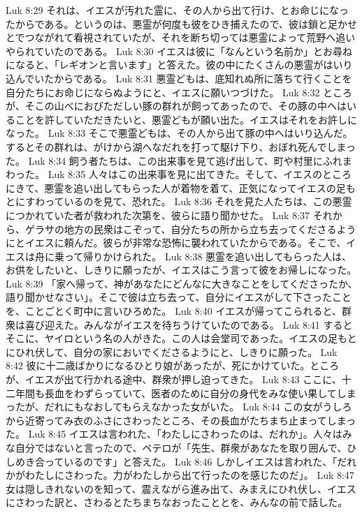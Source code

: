 Luk 8:29  それは、イエスが汚れた霊に、その人から出て行け、とお命じになったからである。というのは、悪霊が何度も彼をひき捕えたので、彼は鎖と足かせとでつながれて看視されていたが、それを断ち切っては悪霊によって荒野へ追いやられていたのである。
Luk 8:30  イエスは彼に「なんという名前か」とお尋ねになると、「レギオンと言います」と答えた。彼の中にたくさんの悪霊がはいり込んでいたからである。
Luk 8:31  悪霊どもは、底知れぬ所に落ちて行くことを自分たちにお命じにならぬようにと、イエスに願いつづけた。
Luk 8:32  ところが、そこの山べにおびただしい豚の群れが飼ってあったので、その豚の中へはいることを許していただきたいと、悪霊どもが願い出た。イエスはそれをお許しになった。
Luk 8:33  そこで悪霊どもは、その人から出て豚の中へはいり込んだ。するとその群れは、がけから湖へなだれを打って駆け下り、おぼれ死んでしまった。
Luk 8:34  飼う者たちは、この出来事を見て逃げ出して、町や村里にふれまわった。
Luk 8:35  人々はこの出来事を見に出てきた。そして、イエスのところにきて、悪霊を追い出してもらった人が着物を着て、正気になってイエスの足もとにすわっているのを見て、恐れた。
Luk 8:36  それを見た人たちは、この悪霊につかれていた者が救われた次第を、彼らに語り聞かせた。
Luk 8:37  それから、ゲラサの地方の民衆はこぞって、自分たちの所から立ち去ってくださるようにとイエスに頼んだ。彼らが非常な恐怖に襲われていたからである。そこで、イエスは舟に乗って帰りかけられた。
Luk 8:38  悪霊を追い出してもらった人は、お供をしたいと、しきりに願ったが、イエスはこう言って彼をお帰しになった。
Luk 8:39  「家へ帰って、神があなたにどんなに大きなことをしてくださったか、語り聞かせなさい」。そこで彼は立ち去って、自分にイエスがして下さったことを、ことごとく町中に言いひろめた。
Luk 8:40  イエスが帰ってこられると、群衆は喜び迎えた。みんながイエスを待ちうけていたのである。
Luk 8:41  するとそこに、ヤイロという名の人がきた。この人は会堂司であった。イエスの足もとにひれ伏して、自分の家においでくださるようにと、しきりに願った。
Luk 8:42  彼に十二歳ばかりになるひとり娘があったが、死にかけていた。ところが、イエスが出て行かれる途中、群衆が押し迫ってきた。
Luk 8:43  ここに、十二年間も長血をわずらっていて、医者のために自分の身代をみな使い果してしまったが、だれにもなおしてもらえなかった女がいた。
Luk 8:44  この女がうしろから近寄ってみ衣のふさにさわったところ、その長血がたちまち止まってしまった。
Luk 8:45  イエスは言われた、「わたしにさわったのは、だれか」。人々はみな自分ではないと言ったので、ペテロが「先生、群衆があなたを取り囲んで、ひしめき合っているのです」と答えた。
Luk 8:46  しかしイエスは言われた、「だれかがわたしにさわった。力がわたしから出て行ったのを感じたのだ」。
Luk 8:47  女は隠しきれないのを知って、震えながら進み出て、みまえにひれ伏し、イエスにさわった訳と、さわるとたちまちなおったこととを、みんなの前で話した。
